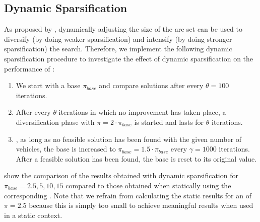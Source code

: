 \documentclass[11pt,a4paper,fleqn]{article}
\begin{document}
\subsection{Dynamic Sparsification}
\label{sec:54}
As proposed by \citet{toth:03}, dynamically adjusting the size of the \reduced arc set can be used to diversify (by doing weaker sparsification) and intensify (by doing stronger sparsification) the search. Therefore, we implement the following dynamic sparsification procedure to investigate the effect of dynamic sparsification on the performance of \tsnew:
\begin{enumerate}
\item We start with a base \sfa $\pi_{\mathit{base}}$ and compare solutions after every $\theta=100$ iterations. 
\item After every $\theta$ iterations in which no improvement has taken place, a diversification phase with $\pi = 2 \cdot \pi_{\mathit{base}}$ is started and lasts for $\theta$ iterations. 
\item {}, as long as no feasible solution has been found with the given number of vehicles, the base \sfa is increased to $\pi_{\mathit{base}}=  1.5 \cdot \pi_{\mathit{base}}$ every
    $\gamma=1000$ iterations. After a feasible solution has been found, the base \sfa is reset to its original value. 
 \end{enumerate}

 show the comparison of the results obtained with dynamic sparsification for $\pi_{\mathit{base}} = 2.5,  5, 10,15$ compared to those obtained when statically using the corresponding \sfa. Note that we refrain from calculating the static results for an \sfa of $\pi=2.5$ because this \sfa is simply too small to achieve meaningful results when used in a static context.  
\end{document}
